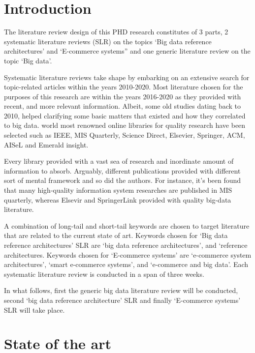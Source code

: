  \label{chap:litrev}

\section{Introduction}\label{sec:Introduction}

The literature review design of this PHD research constitutes of 3 parts, 2 systematic literature reviews (SLR) on the topics ‘Big data reference architectures’ and ‘E-commerce systems” and one generic literature review on the topic ‘Big data’.

Systematic literature reviews take shape by embarking on an extensive search for topic-related articles within the years 2010-2020. Most literature chosen for the purposes of this research are within the years 2016-2020 as they provided with recent, and more relevant information. Albeit, some old studies dating back to 2010, helped clarifying some basic matters that existed and how they correlated to big data. world most renowned online libraries for quality research have been selected such as IEEE, MIS Quarterly, Science Direct, Elsevier, Springer, ACM, AISeL and Emerald insight.

Every library provided with a vast sea of research and inordinate amount of information to absorb. Arguably, different publications provided with different sort of mental framework and so did the authors. For instance, it’s been found that many high-quality information system researches are published in MIS quarterly, whereas Elsevir and SpringerLink provided with quality big-data literature.

A combination of long-tail and short-tail keywords are chosen to target literature that are related to the current state of art. Keywords chosen for ‘Big data reference architectures’ SLR are ‘big data reference architectures’, and ‘reference architectures. Keywords chosen for ‘E-commerce systems’ are ‘e-commerce system architectures’, ‘smart e-commerce systems’, and ‘e-commerce and big data’. Each systematic literature review is conducted in a span of three weeks.

In what follows, first the generic big data literature review will be conducted, second ‘big data reference architecture’ SLR and finally ‘E-commerce systems’ SLR will take place.

\section{State of the art}\label{sec:State of the art}


